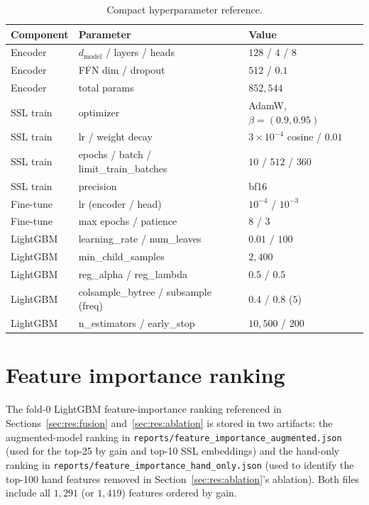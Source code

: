 \documentclass[sigconf, anonymous, review]{acmart}
\begin{document}
\begin{table}[t]
\centering
\caption{Compact hyperparameter reference.}
\label{tab:hparams}
\small
\begin{tabular}{l l l}
\toprule
Component & Parameter & Value \\
\midrule
Encoder & $d_{\text{model}}$ / layers / heads & $128$ / $4$ / $8$ \\
Encoder & FFN dim / dropout & $512$ / $0.1$ \\
Encoder & total params & $852{,}544$ \\
SSL train & optimizer & AdamW, $\beta = (0.9, 0.95)$ \\
SSL train & lr / weight decay & $3 \times 10^{-4}$ cosine / $0.01$ \\
SSL train & epochs / batch / limit\_train\_batches & $10$ / $512$ / $360$ \\
SSL train & precision & bf16 \\
Fine-tune & lr (encoder / head) & $10^{-4}$ / $10^{-3}$ \\
Fine-tune & max epochs / patience & $8$ / $3$ \\
LightGBM & learning\_rate / num\_leaves & $0.01$ / $100$ \\
LightGBM & min\_child\_samples & $2{,}400$ \\
LightGBM & reg\_alpha / reg\_lambda & $0.5$ / $0.5$ \\
LightGBM & colsample\_bytree / subsample (freq) & $0.4$ / $0.8$ ($5$) \\
LightGBM & n\_estimators / early\_stop & $10{,}500$ / $200$ \\
\bottomrule
\end{tabular}
\end{table}

\section{Feature importance ranking}
\label{app:importance}

The fold-0 LightGBM feature-importance ranking referenced in
Sections~\ref{sec:res:fusion} and~\ref{sec:res:ablation} is stored in
two artifacts: the augmented-model ranking in
\texttt{reports/feature\_importance\_augmented.json} (used for the
top-25 by gain and top-10 SSL embeddings) and the hand-only ranking
in \texttt{reports/feature\_importance\_hand\_only.json} (used to
identify the top-100 hand features removed in
Section~\ref{sec:res:ablation}'s ablation). Both files include all
$1{,}291$ (or $1{,}419$) features ordered by gain.
\end{document}
